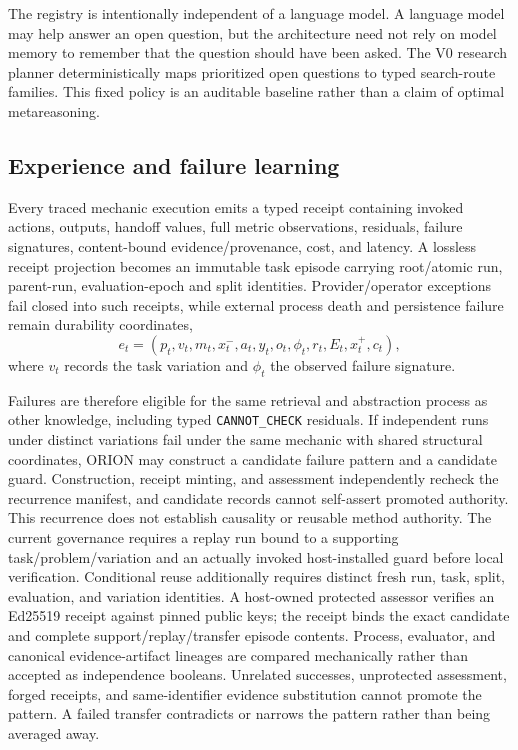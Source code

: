 The registry is intentionally independent of a language model.  A language model may help answer an open question, but the architecture need not rely on model memory to remember that the question should have been asked.  The V0 research planner deterministically maps prioritized open questions to typed search-route families.  This fixed policy is an auditable baseline rather than a claim of optimal metareasoning.

\subsection{Experience and failure learning}

Every traced mechanic execution emits a typed receipt containing invoked actions, outputs, handoff values, full metric observations, residuals, failure signatures, content-bound evidence/provenance, cost, and latency.  A lossless receipt projection becomes an immutable task episode carrying root/atomic run, parent-run, evaluation-epoch and split identities.  Provider/operator exceptions fail closed into such receipts, while external process death and persistence failure remain durability coordinates,
\[
e_t=(p_t,v_t,m_t,x_t^{-},a_t,y_t,o_t,\phi_t,r_t,E_t,x_t^{+},c_t),
\]
where $v_t$ records the task variation and $\phi_t$ the observed failure signature.

Failures are therefore eligible for the same retrieval and abstraction process as other knowledge, including typed \texttt{CANNOT\_CHECK} residuals.  If independent runs under distinct variations fail under the same mechanic with shared structural coordinates, ORION may construct a candidate failure pattern and a candidate guard.  Construction, receipt minting, and assessment independently recheck the recurrence manifest, and candidate records cannot self-assert promoted authority.  This recurrence does not establish causality or reusable method authority.  The current governance requires a replay run bound to a supporting task/problem/variation and an actually invoked host-installed guard before local verification.  Conditional reuse additionally requires distinct fresh run, task, split, evaluation, and variation identities.  A host-owned protected assessor verifies an Ed25519 receipt against pinned public keys; the receipt binds the exact candidate and complete support/replay/transfer episode contents.  Process, evaluator, and canonical evidence-artifact lineages are compared mechanically rather than accepted as independence booleans.  Unrelated successes, unprotected assessment, forged receipts, and same-identifier evidence substitution cannot promote the pattern.  A failed transfer contradicts or narrows the pattern rather than being averaged away.

